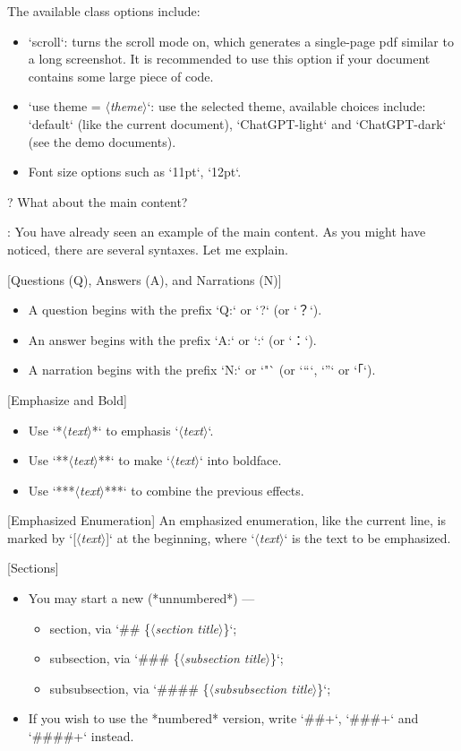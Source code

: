 \documentclass[%
  use style = classical,
  scroll,
]{Q-A}
\newcommand{\meta}[1]{$\langle${\normalfont\itshape#1}$\rangle$}
\def\textast{*}
\def\textsharp{\#}
\begin{document}
  The available class options include:
  \begin{itemize}
    \item `scroll`: turns the scroll mode on, which generates a single-page pdf similar to a long screenshot. It is recommended to use this option if your document contains some large piece of code.
    \item `use theme = \meta{theme}`: use the selected theme, available choices include: `default` (like the current document), `ChatGPT-light` and `ChatGPT-dark` (see the demo documents).
    \item Font size options such as `11pt`, `12pt`.
  \end{itemize}

?
  What about the main content?

:
  You have already seen an example of the main content. As you might have noticed, there are several syntaxes. Let me explain.

  [Questions (Q), Answers (A), and Narrations (N)]
  \begin{itemize}
    \item A question begins with the prefix `Q:` or `?` (or `？`).
    \item An answer begins with the prefix `A:` or `:` (or `：`).
    \item A narration begins with the prefix `N:` or `"` (or `“`, `”` or `「`).
  \end{itemize}

  [Emphasize and Bold]
  \begin{itemize}
    \item Use `\textast\meta{text}\textast` to emphasis `\meta{text}`.
    \item Use `\textast\textast\meta{text}\textast\textast` to make `\meta{text}` into boldface.
    \item Use `\textast\textast\textast\meta{text}\textast\textast\textast` to combine the previous effects.
  \end{itemize}

  [Emphasized Enumeration]
  An emphasized enumeration, like the current line, is marked by `[\meta{text}]` at the beginning, where `\meta{text}` is the text to be emphasized.

  [Sections]
  \begin{itemize}
    \item You may start a new (*unnumbered*) ---
    \begin{itemize}
      \item section, via `\textsharp\textsharp{} \{\meta{section title}\}`;
      \item subsection, via `\textsharp\textsharp\textsharp{} \{\meta{subsection title}\}`;
      \item subsubsection, via `\textsharp\textsharp\textsharp\textsharp{} \{\meta{subsubsection title}\}`;
    \end{itemize}
    \item If you wish to use the *numbered* version, write `\textsharp\textsharp+`, `\textsharp\textsharp\textsharp+` and `\textsharp\textsharp\textsharp\textsharp+` instead.
  \end{itemize}
\end{document}
